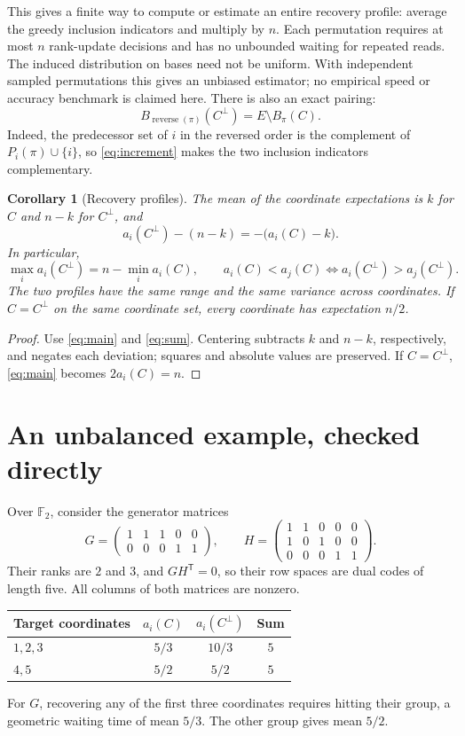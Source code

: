 \documentclass[11pt]{article}
\newtheorem{corollary}[theorem]{Corollary}
\theoremstyle{remark}
\newcommand{\F}{\mathbb F}
\begin{document}
This gives a finite way to compute or estimate an entire recovery profile:
average the greedy inclusion indicators and multiply by $n$.
Each permutation requires at most $n$ rank-update decisions and has no
unbounded waiting for repeated reads. The induced distribution on bases
need not be uniform. With independent sampled permutations this gives an
unbiased estimator; no empirical speed or accuracy benchmark is claimed here.
There is also an exact pairing:
\[
 B_{\operatorname{reverse}(\pi)}(C^\perp)=E\setminus B_\pi(C).
\]
Indeed, the predecessor set of $i$ in the reversed order is the complement
of $P_i(\pi)\cup\{i\}$, so \eqref{eq:increment} makes the two inclusion
indicators complementary.

\begin{corollary}[Recovery profiles]\label{cor:profiles}
The mean of the coordinate expectations is $k$ for $C$ and $n-k$ for
$C^\perp$, and
\[
 a_i(C^\perp)-(n-k)=-\bigl(a_i(C)-k\bigr).
\]
In particular,
\[
 \max_i a_i(C^\perp)=n-\min_i a_i(C),\qquad
 a_i(C)<a_j(C)\iff a_i(C^\perp)>a_j(C^\perp).
\]
The two profiles have the same range and the same variance across
coordinates. If $C=C^\perp$ on the same coordinate set, every coordinate
has expectation $n/2$.
\end{corollary}
\begin{proof}
Use \eqref{eq:main} and \eqref{eq:sum}. Centering subtracts $k$ and $n-k$,
respectively, and negates each deviation; squares and absolute values are
preserved. If $C=C^\perp$, \eqref{eq:main} becomes $2a_i(C)=n$.
\end{proof}

\section{An unbalanced example, checked directly}
Over $\F_2$, consider the generator matrices
\[
 G=\begin{pmatrix}1&1&1&0&0\\0&0&0&1&1\end{pmatrix},\qquad
 H=\begin{pmatrix}1&1&0&0&0\\1&0&1&0&0\\0&0&0&1&1\end{pmatrix}.
\]
Their ranks are $2$ and $3$, and $GH^{\mathsf T}=0$, so their row spaces
are dual codes of length five. All columns of both matrices are nonzero.
\begin{center}
\begin{tabular}{lccc}
\toprule
Target coordinates & $a_i(C)$ & $a_i(C^\perp)$ & Sum\\
\midrule
$1,2,3$ & $5/3$ & $10/3$ & $5$\\
$4,5$ & $5/2$ & $5/2$ & $5$\\
\bottomrule
\end{tabular}
\end{center}
For $G$, recovering any of the first three coordinates requires hitting
their group, a geometric waiting time of mean $5/3$. The other group gives
mean $5/2$.
\end{document}
